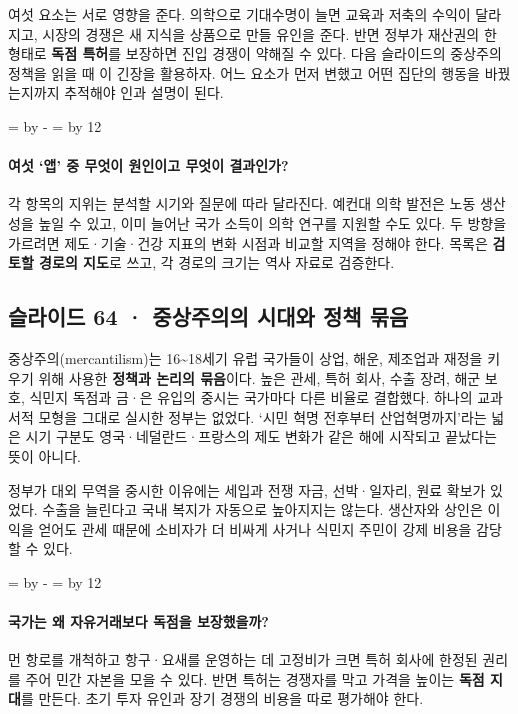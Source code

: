 \documentclass[10pt,a4paper]{article}
\newcommand{\ReserveQuestionSpace}{%
  \par\begingroup
  \dimen0=\pagegoal \advance\dimen0 by -\pagetotal
  \dimen2=\baselineskip \multiply\dimen2 by 12
  \ifdim\dimen0<\dimen2 \newpage\fi
  \endgroup}
\begin{document}
여섯 요소는 서로 영향을 준다. 의학으로 기대수명이 늘면 교육과 저축의 수익이 달라지고, 시장의 경쟁은 새 지식을 상품으로 만들 유인을 준다. 반면 정부가 재산권의 한 형태로 \textbf{독점 특허}를 보장하면 진입 경쟁이 약해질 수 있다. 다음 슬라이드의 중상주의 정책을 읽을 때 이 긴장을 활용하자. 어느 요소가 먼저 변했고 어떤 집단의 행동을 바꿨는지까지 추적해야 인과 설명이 된다.\par

\ReserveQuestionSpace
\paragraph{여섯 ‘앱’ 중 무엇이 원인이고 무엇이 결과인가?}
각 항목의 지위는 분석할 시기와 질문에 따라 달라진다. 예컨대 의학 발전은 노동 생산성을 높일 수 있고, 이미 늘어난 국가 소득이 의학 연구를 지원할 수도 있다. 두 방향을 가르려면 제도·기술·건강 지표의 변화 시점과 비교할 지역을 정해야 한다. 목록은 \textbf{검토할 경로의 지도}로 쓰고, 각 경로의 크기는 역사 자료로 검증한다.\par

\subsection{슬라이드 64 · 중상주의의 시대와 정책 묶음}
중상주의(mercantilism)는 16\textasciitilde{}18세기 유럽 국가들이 상업, 해운, 제조업과 재정을 키우기 위해 사용한 \textbf{정책과 논리의 묶음}이다. 높은 관세, 특허 회사, 수출 장려, 해군 보호, 식민지 독점과 금·은 유입의 중시는 국가마다 다른 비율로 결합했다. 하나의 교과서적 모형을 그대로 실시한 정부는 없었다. ‘시민 혁명 전후부터 산업혁명까지’라는 넓은 시기 구분도 영국·네덜란드·프랑스의 제도 변화가 같은 해에 시작되고 끝났다는 뜻이 아니다.\par

정부가 대외 무역을 중시한 이유에는 세입과 전쟁 자금, 선박·일자리, 원료 확보가 있었다. 수출을 늘린다고 국내 복지가 자동으로 높아지지는 않는다. 생산자와 상인은 이익을 얻어도 관세 때문에 소비자가 더 비싸게 사거나 식민지 주민이 강제 비용을 감당할 수 있다.\par

\ReserveQuestionSpace
\paragraph{국가는 왜 자유거래보다 독점을 보장했을까?}
먼 항로를 개척하고 항구·요새를 운영하는 데 고정비가 크면 특허 회사에 한정된 권리를 주어 민간 자본을 모을 수 있다. 반면 특허는 경쟁자를 막고 가격을 높이는 \textbf{독점 지대}를 만든다. 초기 투자 유인과 장기 경쟁의 비용을 따로 평가해야 한다.\par
\end{document}
